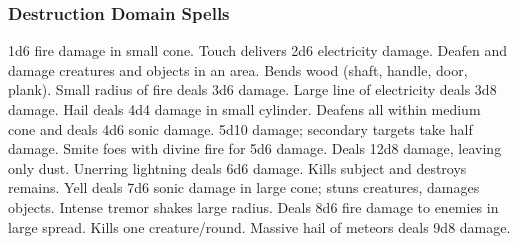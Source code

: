 \subsubsection{Destruction Domain Spells}

\begin{spelllist}
   1d6 fire damage in small cone.
   Touch delivers 2d6 electricity damage.
   Deafen and damage creatures and objects in an area. 
   Bends wood (shaft, handle, door, plank).
   Small radius of fire deals 3d6 damage.
   Large line of electricity deals 3d8 damage.
   Hail deals 4d4 damage in small cylinder.
   Deafens all within medium cone and deals 4d6 sonic damage.
   5d10 damage; secondary targets take half damage.
   Smite foes with divine fire for 5d6 damage.
   Deals 12d8 damage, leaving only dust.
   Unerring lightning deals 6d6 damage.
  \F Kills subject and destroys remains.
   Yell deals 7d6 sonic damage in large cone; stuns creatures, damages objects.
   Intense tremor shakes large radius.
   Deals 8d6 fire damage to enemies in large spread.
   Kills one creature/round.
   Massive hail of meteors deals 9d8 damage.
\end{spelllist}

